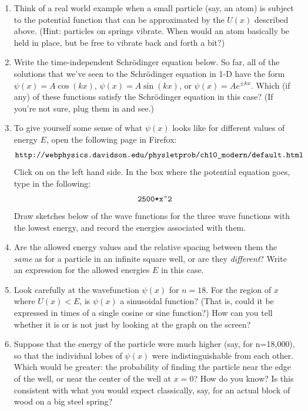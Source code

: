 \begin{enumerate}[wide]
\item Think of a real world example when a small particle (say, an atom) is subject to the potential function that can be approximated by the $U(x)$ described above.  (Hint: particles on springs vibrate.  When would an atom basically be held in place, but be free to vibrate back and forth a bit?)
\answerspace{0.6in}

\item Write the time-independent Schr\"odinger equation below.  So far, all of the solutions that we've seen to the 
Schr\"odinger equation in 1-D have the form $\psi(x) = A\cos(kx)$, $\psi(x) = A\sin(kx)$, or $\psi(x) = Ae^{\pm kx}$.  Which (if any) of these functions satisfy the Schr\"odinger equation in this case?  (If you're not sure, plug them in and see.) 
\answerspace{1.6in}

\item To give yourself some sense of what $\psi(x)$ looks like for different values of energy $E$, open the following page in Firefox:
$$\verb!http://webphysics.davidson.edu/physletprob/ch10_modern/default.html!$$
Click on  on the left hand side.  In the box where the potential equation goes, type in the following: $$\verb!2500*x^2!$$
Draw sketches below of the wave functions for the three wave functions with the lowest energy, and record the energies associated with them.  
\answerspace{1.6in}

\item Are the allowed energy values and the relative spacing between them the \textit{same} as for a particle in an infinite square well, or are they \textit{different}?  Write an expression for the allowed energies $E$ in this case.
\answerspace{1.0in}

\item Look carefully at the wavefunction $\psi(x)$ for $n=18$.  For the region of $x$ where $U(x)<E$, is $\psi(x)$ a sinusoidal function?  (That is, could it be expressed in times of a single cosine or sine function?)  How can you tell whether it is or is not just by looking at the graph on the screen?  
\answerspace{1.0in}

\item Suppose that the energy of the particle were much higher (say, for n=18,000), so that the individual lobes of $\psi(x)$ were indistinguishable from each other.  Which would be greater: the probability of finding the particle near the edge of the well, or near the center of the well at $x = 0$?  How do you know?  Is this consistent with what you would expect classically, say, for an actual block of wood on a big steel spring?
\answerspace{0.8in}
\end{enumerate}
